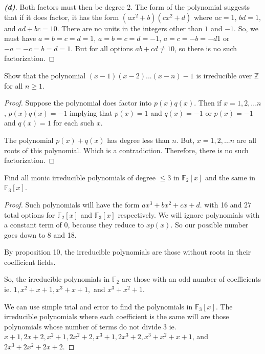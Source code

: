 \documentclass[10pt]{article}
\newenvironment{problem}[2][Problem]{\begin{trivlist}
		\item[\hskip \labelsep {\bfseries #1}\hskip \labelsep {\bfseries #2.}]}{\end{trivlist}}
\begin{document}
\begin{problem}{4.1}
\begin{proof}[\textbf{(d)}]
			Both factors must then be degree 2. The form of the polynomial suggests that if it does factor, it has the form $(ax^2 + b)(cx^2 + d)$ where $ac=1$, $bd=1$, and $ad+bc=10$. There are no units in the integers other than $1$ and $-1$. So, we must have $a=b=c=d=1$, $a=b=c=d=-1$, $a=c=-b=-d1$ or $-a=-c=b=d=1$. But for all options $ab+cd \not= 10$, so there is no such factorization.
		\end{proof}
	\end{problem}
	
	\begin{problem}{4.3}
		Show that the polynomial $(x-1)(x-2)...(x-n) - 1$ is irreducible over $\mathbb{Z}$ for all $n \geq 1$.
		\begin{proof}
			Suppose the polynomial does factor into $p(x)q(x)$. Then if $x = 1,2,...n$, $p(x)q(x)=-1$ implying that $p(x)=1$ and $q(x)=-1$ or $p(x)=-1$ and $q(x)=1$ for each such $x$. 
			
			The polynomial $p(x) + q(x)$ has degree less than $n$. But, $x = 1,2,...n$ are all roots of this polynomial. Which is a contradiction. Therefore, there is no such factorization.
		\end{proof}
	\end{problem}
	
	\begin{problem}{4.5}
		Find all monic irreducible polynomials of degree $\leq 3$ in $\mathbb{F}_2[x]$ and the same in $\mathbb{F}_3[x]$.
		\begin{proof}
			Such polynomials will have the form $ax^3 + bx^2 + cx + d$. with 16 and 27 total options for $\mathbb{F}_2[x]$ and $\mathbb{F}_3[x]$ respectively. We will ignore polynomials with a constant term of $0$, because they reduce to $xp(x)$. So our possible number goes down to 8 and 18. 
			
			By proposition 10, the irreducible polynomials are those without roots in their coefficient fields.
			 
			So, the irreducible polynomials in $\mathbb{F}_2$ are those with an odd number of coefficients ie. $1, x^2+x+1, x^3+x+1,$ and $x^3+x^2+1$. 
			
			We can use simple trial and error to find the polynomials in $\mathbb{F}_3[x]$. The irreducible polynomials where each coefficient is the same will are those polynomials whose number of terms do not divide $3$ ie. $x+1, 2x+2, x^2+1, 2x^2+2, x^3+1, 2x^3+2, x^3 + x^2 + x + 1$, and $2x^3+2x^2+2x+2$.
			
		\end{proof}
	\end{problem}
	
\end{document}
